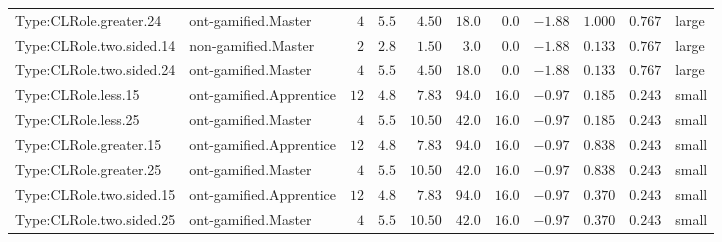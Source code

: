 \documentclass[6pt,a4paper]{article}
\begin{document}
{\begin{longtable}{llrrrrrrrrl}
Type:CLRole.greater.24&ont-gamified.Master&$ 4$&$5.5$&$ 4.50$&$ 18.0$&$ 0.0$&$-1.88$&$1.000$&$0.767$&large\tabularnewline
Type:CLRole.two.sided.14&non-gamified.Master&$ 2$&$2.8$&$ 1.50$&$  3.0$&$ 0.0$&$-1.88$&$0.133$&$0.767$&large\tabularnewline
Type:CLRole.two.sided.24&ont-gamified.Master&$ 4$&$5.5$&$ 4.50$&$ 18.0$&$ 0.0$&$-1.88$&$0.133$&$0.767$&large\tabularnewline
Type:CLRole.less.15&ont-gamified.Apprentice&$12$&$4.8$&$ 7.83$&$ 94.0$&$16.0$&$-0.97$&$0.185$&$0.243$&small\tabularnewline
Type:CLRole.less.25&ont-gamified.Master&$ 4$&$5.5$&$10.50$&$ 42.0$&$16.0$&$-0.97$&$0.185$&$0.243$&small\tabularnewline
Type:CLRole.greater.15&ont-gamified.Apprentice&$12$&$4.8$&$ 7.83$&$ 94.0$&$16.0$&$-0.97$&$0.838$&$0.243$&small\tabularnewline
Type:CLRole.greater.25&ont-gamified.Master&$ 4$&$5.5$&$10.50$&$ 42.0$&$16.0$&$-0.97$&$0.838$&$0.243$&small\tabularnewline
\newpage
Type:CLRole.two.sided.15&ont-gamified.Apprentice&$12$&$4.8$&$ 7.83$&$ 94.0$&$16.0$&$-0.97$&$0.370$&$0.243$&small\tabularnewline
Type:CLRole.two.sided.25&ont-gamified.Master&$ 4$&$5.5$&$10.50$&$ 42.0$&$16.0$&$-0.97$&$0.370$&$0.243$&small\tabularnewline
\hline
\end{longtable}}
\end{document}
